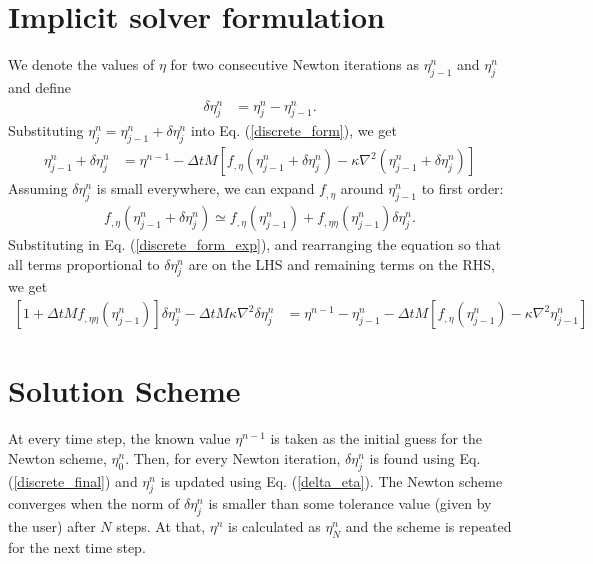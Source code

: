 \documentclass[10pt]{article}
\begin{document}
\section{Implicit solver formulation}
\noindent
We denote the values of $\eta$ for two consecutive Newton iterations as $\eta^{n}_{j-1}$ and $\eta^{n}_{j}$ and define
\begin{align}
\label{delta_eta}
\delta \eta^{n}_{j} &= \eta^{n}_{j} - \eta^{n}_{j-1}.
\end{align}
Substituting $\eta^{n}_{j} = \eta^{n}_{j-1} + \delta \eta^{n}_{j}$ into Eq. (\ref{discrete_form}), we get 
\begin{align}
\label{discrete_form_exp}
\eta^{n}_{j-1} + \delta \eta^{n}_{j}  &= \eta^{n-1} 
- \Delta t M\left[f_{,\eta}(\eta_{j-1}^{n} + \delta \eta^{n}_{j}) -  \kappa \nabla^2 (\eta^{n}_{j-1} + \delta \eta^{n}_{j})\right]
\end{align}
Assuming $\delta \eta^{n}_{j}$ is small everywhere, we can expand $f_{,\eta}$ around $\eta_{j-1}^{n}$ to first order:
\begin{align}
f_{,\eta}(\eta_{j-1}^{n} + \delta \eta^{n}_{j}) \simeq f_{,\eta}(\eta_{j-1}^{n})  + f_{,\eta\eta}(\eta_{j-1}^{n}) \delta \eta^{n}_{j}.
\end{align}
Substituting in Eq. (\ref{discrete_form_exp}), and rearranging the equation so that all terms proportional to $\delta \eta^{n}_{j}$ are on the LHS and remaining terms on the RHS, we get
\begin{align}
\label{discrete_final}
[1 + \Delta t Mf_{,\eta\eta}(\eta_{j-1}^{n})] \delta \eta^{n}_{j} - \Delta t M\kappa \nabla^2  \delta \eta^{n}_{j} &= 
\eta^{n-1} - \eta^{n}_{j-1} 
- \Delta t M\left[f_{,\eta}(\eta_{j-1}^{n}) -  \kappa \nabla^2 \eta^{n}_{j-1}\right]
\end{align}

\section{Solution Scheme}
At every time step, the known value $\eta^{n-1}$ is taken as the initial guess for the Newton scheme, $\eta^{n}_0$. Then, for every Newton iteration, $\delta \eta^{n}_{j}$ is found using Eq. (\ref{discrete_final}) and $\eta^{n}_{j}$ is updated using Eq. (\ref{delta_eta}). The Newton scheme converges when the norm of $\delta \eta^{n}_{j}$ is smaller than some tolerance value (given by the user) after $N$ steps. At that, $\eta^{n}$ is calculated as $\eta^{n}_{N}$ and the scheme is repeated for the next time step.
\end{document}
